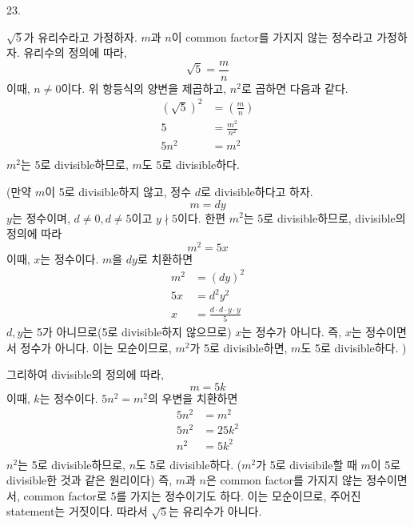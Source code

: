 \documentclass{article}
\begin{document}
23.
\begin{addmargin}[1em]{2em}
$\sqrt{5}$가 유리수라고 가정하자. $m$과 $n$이 common factor를 가지지 않는 정수라고 가정하자. 유리수의 정의에 따라,
\[\sqrt{5} = \frac{m}{n}\]
이때, $n\ne 0$이다. 위 항등식의 양변을 제곱하고, $n^2$로 곱하면 다음과 같다.
\begin{align*}
    (\sqrt{5})^2 &= \left (\frac{m}{n} \right ) \\
    5 &= \frac{m^2}{n^2} \\ 
    5n^2 &= m^2 \\
\end{align*}
$m^2$는 5로 divisible하므로, $m$도 5로 divisible하다. 
\newline

(만약 $m$이 5로 divisible하지 않고, 정수 $d$로 divisible하다고 하자.
\[m=dy\]
$y$는 정수이며, $d \ne 0, d \ne 5$이고 $y \nmid 5$이다. 한편 $m^2$는 5로 divisible하므로, divisible의 정의에 따라
\[m^2=5x\]
이때, $x$는 정수이다. $m$을 $dy$로 치환하면
\begin{align*}
    m^2&=(dy)^2\\
    5x&=d^2y^2\\
    x &= \frac{d\cdot d\cdot y\cdot y}{5}
\end{align*}
$d, y$는 5가 아니므로(5로 divisible하지 않으므로) $x$는 정수가 아니다. 즉, $x$는 정수이면서 정수가 아니다. 이는 모순이므로, $m^2$가 5로 divisible하면, $m$도 5로 divisible하다. )
\newline

그리하여 divisible의 정의에 따라, 
\[m=5k\]
이때, $k$는 정수이다. $5n^2=m^2$의 우변을 치환하면
\begin{align*}
    5n^2 &= m^2 \\
    5n^2 &= 25k^2 \\
    n^2 &= 5k^2 \\
\end{align*}
$n^2$는 5로 divisible하므로, $n$도 5로 divisible하다. ($m^2$가 5로 divisibile할 때 $m$이 5로 divisible한 것과 같은 원리이다)
\newline
즉, $m$과 $n$은 common factor를 가지지 않는 정수이면서, common factor로 5를 가지는 정수이기도 하다. 이는 모순이므로, 주어진 statement는 거짓이다. 따라서 $\sqrt{5}$는 유리수가 아니다.
\end{addmargin}
\end{document}
